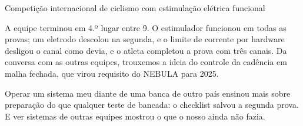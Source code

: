 \begin{atividade}{Competição internacional de ciclismo com estimulação elétrica funcional}
\begin{resultados}
A equipe terminou em 4.º lugar entre 9. O estimulador funcionou em todas as provas; um eletrodo descolou
na segunda, e o limite de corrente por hardware desligou o canal como devia, e o atleta completou a
prova com três canais. Da conversa com as outras equipes, trouxemos a ideia do controle da cadência em
malha fechada, que virou requisito do NEBULA para 2025.
\end{resultados}

\begin{evidencias}
\end{evidencias}

\begin{aprendizados}
Operar um sistema meu diante de uma banca de outro país ensinou mais sobre preparação do que qualquer
teste de bancada: o checklist salvou a segunda prova. E ver sistemas de outras equipes mostrou o que o
nosso ainda não fazia.
\end{aprendizados}
\end{atividade}
